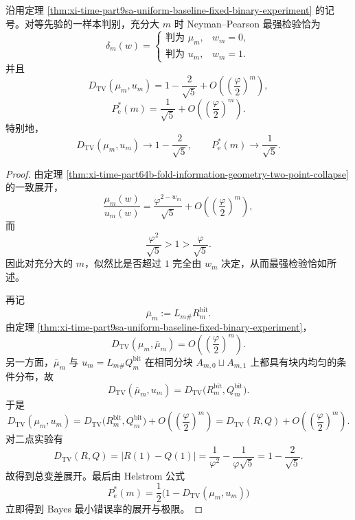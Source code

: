 \begin{corollary}\label{cor:xi-time-part9sa-uniform-baseline-lastbit-neyman-pearson}
沿用定理 \ref{thm:xi-time-part9sa-uniform-baseline-fixed-binary-experiment} 的记号。对等先验的一样本判别，充分大 \(m\) 时 Neyman--Pearson 最强检验恰为
\[
\delta_m(w)=
\begin{cases}
\text{判为 }\mu_m,& w_m=0,\\
\text{判为 }u_m,& w_m=1.
\end{cases}
\]
并且
\[
D_{\mathrm{TV}}(\mu_m,u_m)
=
1-\frac{2}{\sqrt5}
+
O\!\left(\left(\frac{\varphi}{2}\right)^m\right),
\]
\[
P_{\mathrm e}^\ast(m)
=
\frac1{\sqrt5}
+
O\!\left(\left(\frac{\varphi}{2}\right)^m\right).
\]
特别地，
\[
D_{\mathrm{TV}}(\mu_m,u_m)\longrightarrow 1-\frac{2}{\sqrt5},
\qquad
P_{\mathrm e}^\ast(m)\longrightarrow \frac1{\sqrt5}.
\]
\end{corollary}
\begin{proof}
由定理 \ref{thm:xi-time-part64b-fold-information-geometry-two-point-collapse} 的一致展开，
\[
\frac{\mu_m(w)}{u_m(w)}
=
\frac{\varphi^{2-w_m}}{\sqrt5}
+
O\!\left(\left(\frac{\varphi}{2}\right)^m\right),
\]
而
\[
\frac{\varphi^2}{\sqrt5}>1>\frac{\varphi}{\sqrt5}.
\]
因此对充分大的 \(m\)，似然比是否超过 \(1\) 完全由 \(w_m\) 决定，从而最强检验恰如所述。

再记
\[
\bar\mu_m:=L_{m\#}R_m^{\mathrm{bit}}.
\]
由定理 \ref{thm:xi-time-part9sa-uniform-baseline-fixed-binary-experiment}，
\[
D_{\mathrm{TV}}(\mu_m,\bar\mu_m)
=
O\!\left(\left(\frac{\varphi}{2}\right)^m\right).
\]
另一方面，\(\bar\mu_m\) 与 \(u_m=L_{m\#}Q_m^{\mathrm{bit}}\) 在相同分块
\(A_{m,0}\sqcup A_{m,1}\) 上都具有块内均匀的条件分布，故
\[
D_{\mathrm{TV}}(\bar\mu_m,u_m)
=
D_{\mathrm{TV}}\bigl(R_m^{\mathrm{bit}},Q_m^{\mathrm{bit}}\bigr).
\]
于是
\[
D_{\mathrm{TV}}(\mu_m,u_m)
=
D_{\mathrm{TV}}\bigl(R_m^{\mathrm{bit}},Q_m^{\mathrm{bit}}\bigr)
+
O\!\left(\left(\frac{\varphi}{2}\right)^m\right)
=
D_{\mathrm{TV}}(R,Q)
+
O\!\left(\left(\frac{\varphi}{2}\right)^m\right).
\]
对二点实验有
\[
D_{\mathrm{TV}}(R,Q)=|R(1)-Q(1)|
=
\frac{1}{\varphi^2}-\frac{1}{\varphi\sqrt5}
=
1-\frac{2}{\sqrt5}.
\]
故得到总变差展开。最后由 Helstrom 公式
\[
P_{\mathrm e}^\ast(m)
=
\frac12\bigl(1-D_{\mathrm{TV}}(\mu_m,u_m)\bigr)
\]
立即得到 Bayes 最小错误率的展开与极限。
\end{proof}

